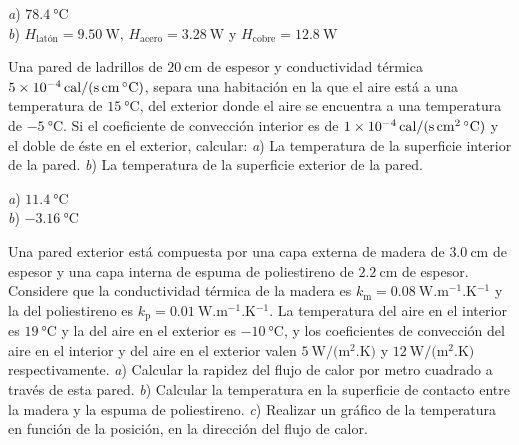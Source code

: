 \begin{Answer}
	\begin{minipage}[t]{.4\textwidth}
    \textit{a}) $\SI{78.4}{\celsius}$\\ \textit{b}) $H_\text{latón} = \SI{9.50}{\watt}$, $H_\text{acero} = \SI{3.28}{\watt}$ y $H_\text{cobre} = \SI{12.8}{\watt}$
  \end{minipage}
\end{Answer}
%
\begin{Exercise}
  Una pared de ladrillos de $\SI{20}{\centi\metre}$ de espesor y conductividad térmica $\SI{5E-4}{cal/(\second.\centi\metre.\celsius)}$, separa una habitación en la que el aire está a una temperatura de $\SI{15}{\celsius}$, del exterior donde el aire se encuentra a una temperatura de $\SI{-5}{\celsius}$. Si el coeficiente de convección interior es de $\SI{1E-4}{cal/(\second.\centi\square\metre.\celsius)}$ y el doble de  éste en el exterior, calcular: \textit{a}) La temperatura de la superficie interior de la pared. \textit{b}) La temperatura de la superficie exterior de la pared.
\end{Exercise}
\begin{Answer}
  \begin{minipage}[t]{.4\textwidth}
    \textit{a}) $\SI{11.4}{\celsius}$\\ \textit{b}) $\SI{-3.16}{\celsius}$
  \end{minipage}
\end{Answer}
%
\begin{Exercise}\label{p:transmision01}
  Una pared exterior está compuesta por una capa externa de madera de $\SI{3.0}{\centi\metre}$ de espesor y una capa interna de espuma de poliestireno de $\SI{2.2}{\centi\metre}$ de espesor. Considere que la conductividad térmica de la madera es $k_\text{m} = \SI{0.08}{\watt.\metre^{-1}.\kelvin^{-1}}$ y la del poliestireno es $k_\text{p} = \SI{0.01}{\watt.\metre^{-1}.\kelvin^{-1}}$. La temperatura del aire en el interior es $\SI{19}{\celsius}$ y la del aire en el exterior es $\SI{-10}{\celsius}$, y los coeficientes de convección del aire en el interior y del aire en el exterior valen $\SI{5}{\watt/(\square\metre.\kelvin)}$ y $\SI{12}{\watt/(\square\metre.\kelvin)}$ respectivamente. \textit{a}) Calcular la rapidez del flujo de calor por metro cuadrado a través de esta pared. \textit{b}) Calcular la temperatura en la superficie de contacto entre la madera y la espuma de poliestireno. \textit{c}) Realizar un gráfico de la temperatura en función de la posición, en la dirección del flujo de calor.
\end{Exercise}

